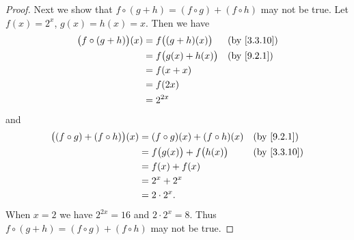 \begin{proof}
  Next we show that \(f \circ (g + h) = (f \circ g) + (f \circ h)\) may not be true.
  Let \(f(x) = 2^x\), \(g(x) = h(x) = x\).
  Then we have
  \begin{align*}
    \big(f \circ (g + h)\big)(x) & = f\big((g + h)(x)\big)  &  & \text{(by \cref{3.3.10})} \\
                                 & = f\big(g(x) + h(x)\big) &  & \text{(by \cref{9.2.1})}  \\
                                 & = f(x + x)                                              \\
                                 & = f(2x)                                                 \\
                                 & = 2^{2x}
  \end{align*}
  and
  \begin{align*}
    \big((f \circ g) + (f \circ h)\big)(x) & = (f \circ g)(x) + (f \circ h)(x)   &  & \text{(by \cref{9.2.1})}  \\
                                           & = f\big(g(x)\big) + f\big(h(x)\big) &  & \text{(by \cref{3.3.10})} \\
                                           & = f(x) + f(x)                                                      \\
                                           & = 2^x + 2^x                                                        \\
                                           & = 2 \cdot 2^x.
  \end{align*}
  When \(x = 2\) we have \(2^{2x} = 16\) and \(2 \cdot 2^x = 8\).
  Thus \(f \circ (g + h) = (f \circ g) + (f \circ h)\) may not be true.


\end{proof}

